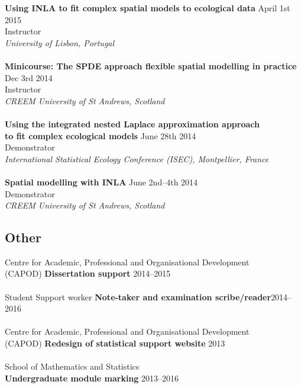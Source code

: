 \documentclass[10pt,letter]{article}
\begin{document}
{\textbf{{Using INLA to fit complex spatial models to ecological data }}} \hfill April 1st 2015\\
 Instructor\\
 {\sl University of Lisbon, Portugal}\\
 \hdashrule[0.5ex]{4cm}{1pt}{1pt}\\
  {\textbf{{Minicourse: The SPDE approach flexible spatial modelling in practice}}} \hfill Dec 3rd  2014\\
 Instructor\\
 {\sl CREEM University of St Andrews, Scotland}\\ 
 \hdashrule[0.5ex]{4cm}{1pt}{1pt}\\
\noindent
    \textbf {Using the integrated nested Laplace approximation approach} \\
    \textbf{to fit complex ecological models}  \hfill June 28th 2014\\
 Demonstrator\\
 {\sl International Statistical Ecology Conference (ISEC), Montpellier, France}\\
 \hdashrule[0.5ex]{4cm}{1pt}{1pt}\\
{\textbf{{Spatial modelling with INLA}}} \hfill June 2nd--4th  2014\\
 Demonstrator\\
 {\sl CREEM University of St Andrews, Scotland}\\ 

  \vspace{1mm}
 \subsection*{Other}
 \vspace{1mm}

 
 Centre for Academic, Professional and Organisational Development\\ (CAPOD) \textbf{Dissertation support} \hfill{2014--2015}\\
 \hdashrule[0.5ex]{4cm}{1pt}{1pt}\\
Student Support worker \textbf{Note-taker and examination scribe/reader}\hfill {2014--2016}\\
\hdashrule[0.5ex]{4cm}{1pt}{1pt}\\
 Centre for Academic, Professional and Organisational Development\\ (CAPOD) \textbf{Redesign of statistical support website} \hfill{2013}\\
 \hdashrule[0.5ex]{4cm}{1pt}{1pt}\\
School of Mathematics and Statistics\\ \textbf{Undergraduate module marking} \hfill{2013--2016}
 
\end{document}
